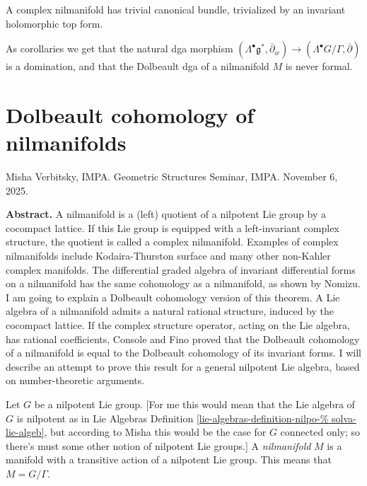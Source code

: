 \begin{theorem}
\label{theorem-bdv7}
A complex nilmanifold has trivial canonical
bundle,
trivialized by an invariant holomorphic top
form.
\end{theorem}

As corollaries we get that the natural dga
morphism
$(\Lambda^\bullet\mathfrak{g}^*,
\overline{\partial}_w)\to
(\Lambda^\bullet
G/\Gamma,\overline{\partial})$ is a
domination,
and that the Dolbeault dga of a nilmanifold
$M$ is never formal.

\section{Dolbeault cohomology of
nilmanifolds}
\label{section-dolbe-cohom-nilma}

\noindent
Misha Verbitsky, IMPA.
Geometric Structures Seminar, IMPA.
November 6, 2025.

\medskip\noindent
{\bf Abstract.}
A nilmanifold is a (left) quotient of a
nilpotent Lie group by a cocompact
lattice. If this Lie group is equipped with a
left-invariant complex structure,
the quotient is called a complex nilmanifold.
Examples of complex nilmanifolds
include Kodaira-Thurston surface and many
other non-Kahler complex manifolds.
The differential graded algebra of invariant
differential forms on a nilmanifold
has the same cohomology as a nilmanifold, as
shown by Nomizu. I am going to
explain a Dolbeault cohomology version of
this theorem. A Lie algebra of a
nilmanifold admits a natural rational
structure, induced by the cocompact
lattice. If the complex structure operator,
acting on the Lie algebra, has
rational coefficients, Console and Fino
proved that the Dolbeault cohomology of
a nilmanifold is equal to the Dolbeault
cohomology of its invariant forms. I
will describe an attempt to prove this result
for a general nilpotent Lie
algebra, based on number-theoretic arguments.

\medskip\noindent
Let $G$ be a nilpotent Lie group.
[For me this would mean that the Lie algebra
of $G$ is
nilpotent as in Lie Algebras Definition
\ref{lie-algebras-definition-nilpo-%
solva-lie-algeb},
but according to Misha this would be the case
for $G$
connected only; so there's must some other
notion
of nilpotent Lie groups.]
A {\it nilmanifold} $M$ is a manifold with a
transitive action
of a nilpotent Lie group. This means that
$M=G/\Gamma$.

